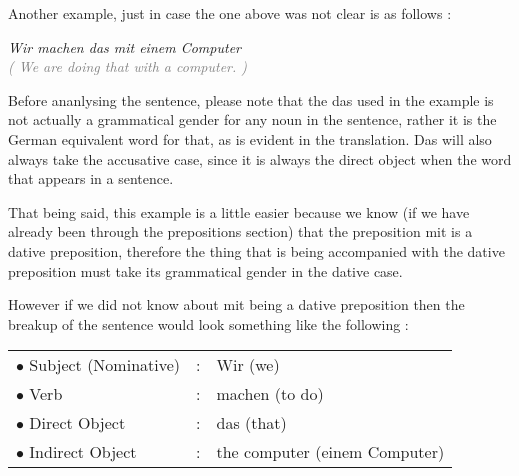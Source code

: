 \documentclass[a4paper,twocolumn,10pt]{article}
\newcommand{\newpar}
{\par \vspace{0.3cm}}
\newcommand{\bulletpoint}
{ $\bullet$  }
\begin{document}
\vspace{0.2cm}

\linenumbers


Another example, just in case the one above was not clear is as follows :
\newpar

\noindent
\textit{Wir machen das mit einem Computer}\\
\textcolor{gray} { \textit{( We are doing that with a computer. )} } \newpar

Before ananlysing the sentence, please note that the das used in the example is
not actually a grammatical gender for any noun in the sentence, rather it is the
German equivalent word for that, as is evident in the translation. Das will also
always take the accusative case, since it is always the direct object when the
word that appears in a sentence.\newpar

That being said, this example is a little easier because we know (if we have
already been through the prepositions section) that the preposition mit is a
dative preposition, therefore the thing that is being accompanied with the
dative preposition must take its grammatical gender in the dative case.\newpar

However if we did not know about mit being a dative preposition then the breakup
of the sentence would look something like the following :\newpar


\nolinenumbers

\vspace{0.2cm}

\begin{tabularx}{0.95\linewidth}{llX}

\rowcolor{white} \bulletpoint Subject (Nominative) & : & Wir (we)   \\
\rowcolor{white} \bulletpoint Verb                 & : & machen (to do) \\
\rowcolor{white} \bulletpoint Direct Object        & : & das (that)  \\
\rowcolor{white} \bulletpoint Indirect Object      & : & the computer (einem
Computer) \\

\end{tabularx}

\vspace{0.2cm}

\linenumbers
\end{document}
